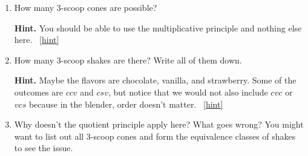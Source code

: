 \documentclass{book}
\begin{document}
\setcounter{project}{119}
\addtocounter{project}{-1}
\begin{activity}[]\label{activity-112}
\begin{enumerate}[font=\bfseries,label=(\alph*),ref=\alph*]
\item\label{task-153} \hypertarget{p-829}{}%
How many 3-scoop cones are possible?%
\par\smallskip%
\noindent\textbf{Hint.}\hypertarget{hint-78}{}\quad%
\hypertarget{p-830}{}%
You should be able to use the multiplicative principle and nothing else here.%
~\hfill{\tiny\hyperlink{a-119.a}{[hint]}\hypertarget{q-119.a}{}}\item\label{task-154} \hypertarget{p-831}{}%
How many 3-scoop shakes are there?  Write all of them down.%
\par\smallskip%
\noindent\textbf{Hint.}\hypertarget{hint-79}{}\quad%
\hypertarget{p-832}{}%
Maybe the flavors are chocolate, vanilla, and strawberry.  Some of the outcomes are \(ccv\) and \(csv\), but notice that we would not also include \(cvc\) or \(vcs\) because in the blender, order doesn't matter.%
~\hfill{\tiny\hyperlink{a-119.b}{[hint]}\hypertarget{q-119.b}{}}\item\label{task-155} \hypertarget{p-833}{}%
Why doesn't the quotient principle apply here?  What goes wrong?  You might want to list out all 3-scoop cones and form the equivalence classes of shakes to see the issue.%
\end{enumerate}
\end{activity}
\end{document}
